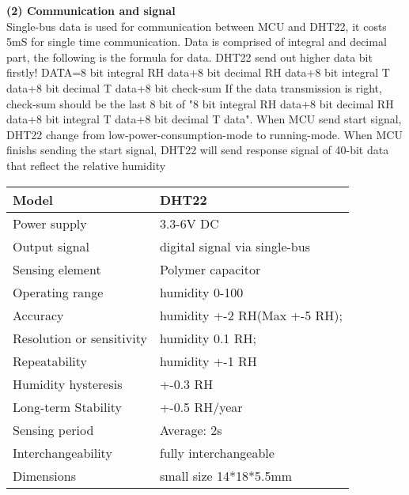 
\textbf{(2) Communication and signal} \\
Single-bus data is used for communication between MCU and DHT22, it costs 5mS for single time communication.
Data is comprised of integral and decimal part, the following is the formula for data.
DHT22 send out higher data bit firstly!
DATA=8 bit integral RH data+8 bit decimal RH data+8 bit integral T data+8 bit decimal T data+8 bit check-sum
If the data transmission is right, check-sum should be the last 8 bit of "8 bit integral RH data+8 bit decimal RH data+8 bit integral T data+8 bit decimal T data".
When MCU send start signal, DHT22 change from low-power-consumption-mode to running-mode. When MCU
finishs sending the start signal, DHT22 will send response signal of 40-bit \cite{Malika:2022} data that reflect the relative humidity

\begin{center} %
	\begin{tabular}{|l|l|} %
		\hline %
		\textbf{Model} & \textbf{DHT22} \\
		\hline %
		Power supply & 3.3-6V DC \\
		\hline
		Output signal & digital signal via single-bus \\
		\hline
		Sensing element & Polymer capacitor \\
		\hline
		Operating range & humidity 0-100  \\
		\hline
		Accuracy & humidity +-2 RH(Max +-5 RH);  \\
		\hline
		Resolution or sensitivity & humidity 0.1 RH; \\
		\hline
		Repeatability& humidity +-1 RH \\
		\hline
		Humidity hysteresis & +-0.3 RH \\
		\hline
		Long-term Stability  & +-0.5 RH/year \\
		\hline
		Sensing period & Average: 2s \\
		\hline
		Interchangeability & fully interchangeable \\
		\hline
		Dimensions & small size 14*18*5.5mm \\
		
		\hline %
	\end{tabular}
\end{center}

